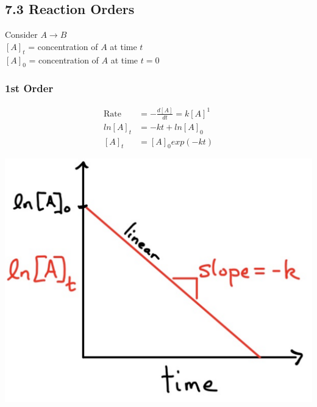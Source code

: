 \subsection{7.3 Reaction Orders}
\vspace*{0.5em}
Consider $A \longrightarrow B$\\
$[A]_t$ = concentration of $A$ at time $t$\\
$[A]_0$ = concentration of $A$ at time $t=0$
\vspace*{0.5em}

    \subsubsection{1st Order}
        \begin{minipage}{0.99\linewidth}
            \begin{minipage}{0.65\linewidth}
                \begin{align*}
                    \text{Rate} &= -\frac{d[A]}{d t} = k[A]^1 \\
                    ln[A]_t &= -k t + ln[A]_0 \\
                    [A]_t& = [A]_0 exp(-k t)
                \end{align*}
            \end{minipage}
            \begin{minipage}{0.34\linewidth}
                \includegraphics[width=0.9\linewidth]{src/7_Kinetics/images/1st_order.pdf}
            \end{minipage}
        \end{minipage}

